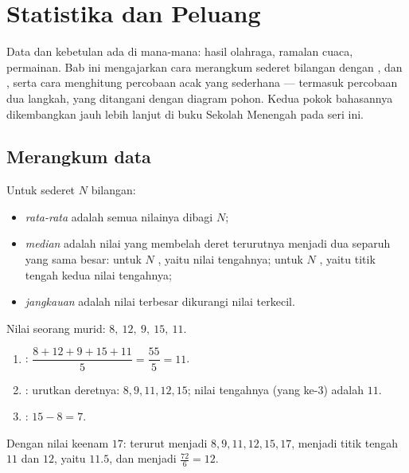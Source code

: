 \chapter{Statistika dan Peluang}\label{ch:g9:statproba}

Data dan kebetulan ada di mana-mana: hasil olahraga, ramalan cuaca,
permainan. Bab ini mengajarkan cara merangkum sederet bilangan dengan
,  dan , serta cara menghitung 
percobaan acak yang sederhana --- termasuk percobaan dua langkah, yang
ditangani dengan diagram pohon. Kedua pokok bahasannya dikembangkan
jauh lebih lanjut di buku Sekolah Menengah pada seri ini.

\section{Merangkum data}

\begin{definition}\label{def:g9:statproba:indicators}
Untuk sederet $N$ bilangan:
\begin{itemize}
  \item \emph{rata-rata} adalah  semua nilainya
        dibagi $N$;
  \item \emph{median} adalah nilai yang membelah deret
        terurutnya menjadi dua separuh yang sama besar: untuk $N$
        , yaitu nilai tengahnya; untuk $N$ , yaitu titik
        tengah kedua nilai tengahnya;
  \item \emph{jangkauan} adalah nilai terbesar
        dikurangi nilai terkecil.
\end{itemize}
\end{definition}

\begin{example}\label{ex:g9:statproba:indicators}
Nilai seorang murid: $8,\ 12,\ 9,\ 15,\ 11$.
\begin{enumerate}
  \item {}: $\dfrac{8 + 12 + 9 + 15 + 11}{5} = \dfrac{55}{5} = 11$.
  \item {}: urutkan deretnya: $8, 9, 11, 12, 15$; nilai tengahnya
        (yang ke-3) adalah $11$.
  \item {}: $15 - 8 = 7$.
\end{enumerate}
Dengan nilai keenam $17$: terurut menjadi $8, 9, 11, 12, 15, 17$,
 menjadi titik tengah $11$ dan $12$, yaitu $11.5$, dan
 menjadi $\frac{72}{6} = 12$.
\end{example}

